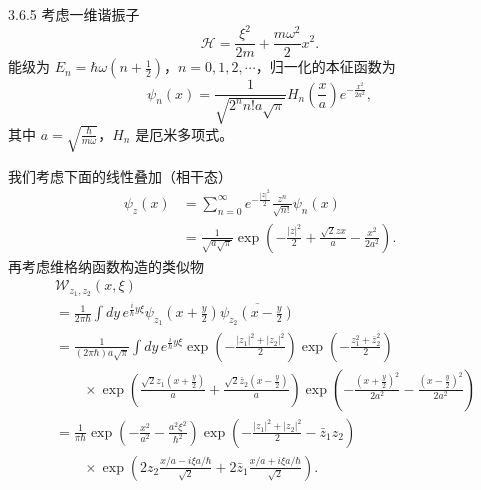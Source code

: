 \begin{example}{3.6.5}
  考虑一维谐振子
  \[
    \mathcal H=\frac{\xi^2}{2m}+\frac{m\omega^2}{2}x^2.
  \]
  能级为 \(E_n=\hbar\omega\left(n+\frac12\right)\)，\(n=0,1,2,\cdots\)，归一化的本征函数为
  \[
    \psi_n(x)=\frac{1}{\sqrt{2^nn!a\sqrt\pi}}
    H_n\left(\frac{x}{a}\right)e^{-\frac{x^2}{2a^2}},
  \]
  其中 \(a=\sqrt{\frac{\hbar}{m\omega}}\)，\(H_n\) 是厄米多项式。

  我们考虑下面的线性叠加（相干态）
  \begin{align*}
    \psi_z(x)
    &=\sum_{n=0}^{\infty}e^{-\frac{|z|^2}{2}}
      \frac{z^n}{\sqrt{n!}}\psi_n(x)\\
    &=\frac{1}{\sqrt{a\sqrt\pi}}
      \exp\left(-\frac{|z|^2}{2}+\frac{\sqrt2zx}{a}-\frac{x^2}{2a^2}\right).
  \end{align*}
  再考虑维格纳函数构造的类似物
  \begin{align*}
    &\mathcal W_{z_1,z_2}(x,\xi)\\
    &=\frac{1}{2\pi\hbar}\int dy\,e^{\frac{i}{\hbar}y\xi}
      \psi_{z_1}\left(x+\frac{y}{2}\right)
      \overline{\psi_{z_2}\left(x-\frac{y}{2}\right)}\\
    &=\frac{1}{(2\pi\hbar)a\sqrt\pi}\int dy\,e^{\frac{i}{\hbar}y\xi}
      \exp\left(-\frac{|z_1|^2+|z_2|^2}{2}\right)
      \exp\left(-\frac{z_1^2+\bar z_2^2}{2}\right)\\
    &\qquad\times\exp\left(
      \frac{\sqrt2z_1\left(x+\frac{y}{2}\right)}{a}
      +\frac{\sqrt2\bar z_2\left(x-\frac{y}{2}\right)}{a}\right)
      \exp\left(
      -\frac{\left(x+\frac{y}{2}\right)^2}{2a^2}
      -\frac{\left(x-\frac{y}{2}\right)^2}{2a^2}\right)\\
    &=\frac{1}{\pi\hbar}\exp\left(-\frac{x^2}{a^2}
      -\frac{a^2\xi^2}{\hbar^2}\right)
      \exp\left(-\frac{|z_1|^2+|z_2|^2}{2}-\bar z_1z_2\right)\\
    &\qquad\times\exp\left(
      2z_2\frac{x/a-i\xi a/\hbar}{\sqrt2}
      +2\bar z_1\frac{x/a+i\xi a/\hbar}{\sqrt2}\right).
  \end{align*}
\end{example}

